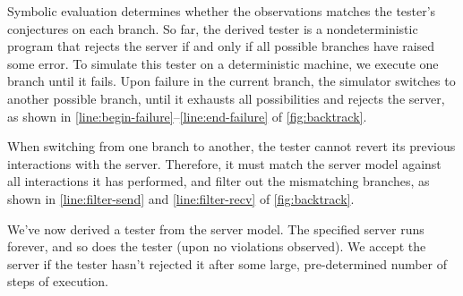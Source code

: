 Symbolic evaluation determines whether the observations matches the tester's
conjectures on each branch.  So far, the derived tester
is a nondeterministic program that rejects the server if and only if all
possible branches have raised some error.  To simulate this tester on a
deterministic machine, we execute one branch until it fails.  Upon failure in
the current branch, the simulator switches to another possible branch, until it
exhausts all possibilities and rejects the server, as shown in
\autoref{line:begin-failure}--\ref{line:end-failure} of
\autoref{fig:backtrack}.

When switching from one branch to another, the tester cannot revert its previous
interactions with the server.  Therefore, it must match the server model against
all interactions it has performed, and filter out the mismatching branches, as
shown in \autoref{line:filter-send} and \autoref{line:filter-recv} of
\autoref{fig:backtrack}.

We've now derived a tester from the server model.  The specified server runs
forever, and so does the tester (upon no violations observed).  We accept the
server if the tester hasn't rejected it after some large, pre-determined number
of steps of execution.
